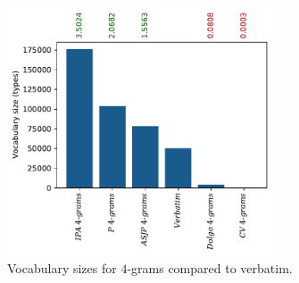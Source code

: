 \begin{figure}
  \centering
  \includegraphics[width=0.7\textwidth]{figures/vocab_sizes_2021-07-28_14-42-08_gb_ngram}
  \caption{Vocabulary sizes for $4$-grams compared to verbatim.}
  \label{fig:vssf_ngrams_gb}
\end{figure}